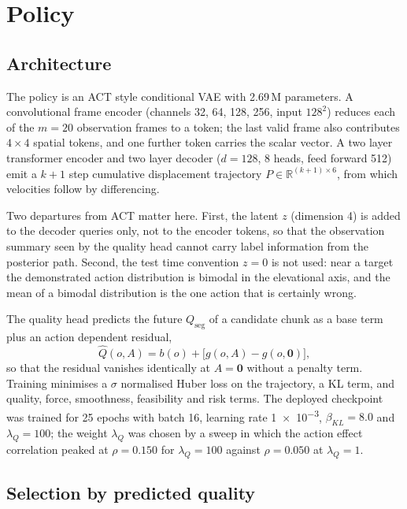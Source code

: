 \documentclass[conference]{IEEEtran}
\begin{document}
\section{Policy}
\label{sec:policy}

\subsection{Architecture}

The policy is an ACT style conditional VAE with \num{2.69}\,M parameters. A
convolutional frame encoder (channels 32, 64, 128, 256, input $128^2$) reduces
each of the $m = 20$ observation frames to a token; the last valid frame also
contributes $4 \times 4$ spatial tokens, and one further token carries the
scalar vector. A two layer transformer encoder and two layer decoder
($d = 128$, 8 heads, feed forward 512) emit a $k+1$ step cumulative displacement
trajectory $P \in \mathbb{R}^{(k+1) \times 6}$, from which velocities follow by
differencing.

Two departures from ACT matter here. First, the latent $z$ (dimension 4) is
added to the decoder queries only, not to the encoder tokens, so that the
observation summary seen by the quality head cannot carry label information from
the posterior path. Second, the test time convention $z = 0$ is not used:
near a target the demonstrated action distribution is bimodal in the elevational
axis, and the mean of a bimodal distribution is the one action that is certainly
wrong.

The quality head predicts the future $Q_\mathrm{seg}$ of a candidate chunk as a
base term plus an action dependent residual,
\begin{equation}
\hat Q(o, A) = b(o) + \big[g(o, A) - g(o, \mathbf{0})\big],
\end{equation}
so that the residual vanishes identically at $A = \mathbf{0}$ without a penalty
term. Training minimises a $\sigma$ normalised Huber loss on the trajectory, a
KL term, and quality, force, smoothness, feasibility and risk terms. The
deployed checkpoint was trained for 25 epochs with batch 16, learning rate
\num{1e-3}, $\beta_{KL} = \num{8.0}$ and $\lambda_Q = \num{100}$; the weight
$\lambda_Q$ was chosen by a sweep in which the action effect correlation peaked
at $\rho = \num{+0.150}$ for $\lambda_Q = \num{100}$ against
$\rho = \num{+0.050}$ at $\lambda_Q = 1$.

\subsection{Selection by predicted quality}
\end{document}
